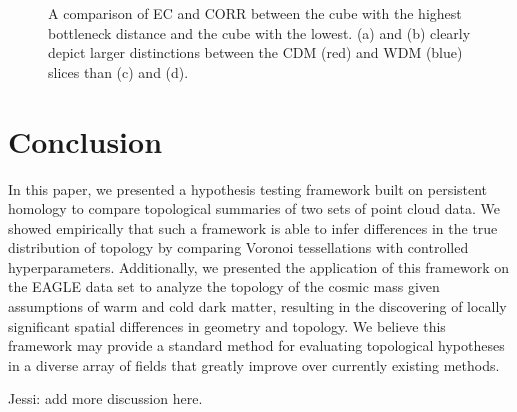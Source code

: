 \documentclass[12pt]{article}
\begin{document}
\begin{figure}[htp!]
\begin{subfigure}{0.48\textwidth}
    \label{fig:valid4}
  \end{subfigure}
    \caption{A comparison of EC and CORR between the cube with the highest bottleneck distance and the cube with the lowest. (a) and (b) clearly depict larger distinctions between the CDM (red) and WDM (blue) slices than (c) and (d).}
    \label{fig:validationfigs}
\end{figure}




\section{Conclusion}
\label{sec:conc}
In this paper, we presented a hypothesis testing framework built on persistent homology to compare topological summaries of two sets of point cloud data. We showed empirically that such a framework is able to infer differences in the true distribution of topology by comparing Voronoi tessellations with controlled hyperparameters. Additionally, we presented the application of this framework on the EAGLE data set to analyze the topology of the cosmic mass given assumptions of warm and cold dark matter, resulting in the discovering of locally significant spatial differences in geometry and topology. We believe this framework may provide a standard method for evaluating topological hypotheses in a diverse array of fields that greatly improve over currently existing methods.

{\color{blue}  Jessi:  add more discussion here.}



\end{document}

